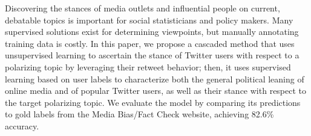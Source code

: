 Discovering the stances of media outlets and influential people on current, debatable topics is important for social statisticians and policy makers. Many supervised solutions exist for determining viewpoints, but manually annotating training data is costly. In this paper, we propose a cascaded method that uses unsupervised learning to ascertain the stance of Twitter users with respect to a polarizing topic by leveraging their retweet behavior; then, it uses supervised learning based on user labels to characterize both the general political leaning of online media and of popular Twitter users, as well as their stance with respect to the target polarizing topic. We evaluate the model by comparing its predictions to gold labels from the Media Bias/Fact Check website, achieving 82.6\% accuracy.
